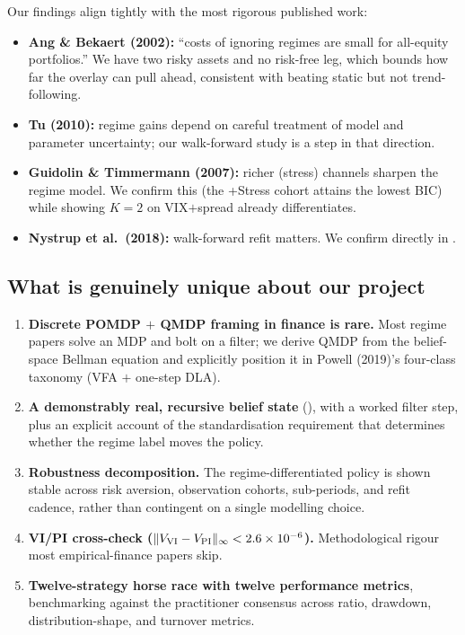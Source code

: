 \documentclass[11pt]{article}
\theoremstyle{plain1}
\theoremstyle{definition1}
\newcommand{\1}{\mathbf{1}}
\begin{document}
Our findings align tightly with the most rigorous published work:
\begin{itemize}[leftmargin=1.5em]
  \item \textbf{Ang \& Bekaert (2002):} ``costs of ignoring regimes are small for all-equity portfolios.'' We have two risky assets and no risk-free leg, which bounds how far the overlay can pull ahead, consistent with beating static but not trend-following.
  \item \textbf{Tu (2010):} regime gains depend on careful treatment of model and parameter uncertainty; our walk-forward study is a step in that direction.
  \item \textbf{Guidolin \& Timmermann (2007):} richer (stress) channels sharpen the regime model. We confirm this (the +Stress cohort attains the lowest BIC) while showing $K=2$ on VIX$+$spread already differentiates.
  \item \textbf{Nystrup et al.\ (2018):} walk-forward refit matters. We confirm directly in .
\end{itemize}

\subsection{What is genuinely unique about our project}

\begin{enumerate}[leftmargin=1.5em,itemsep=2pt]
  \item \textbf{Discrete POMDP $+$ QMDP framing in finance is rare.} Most regime papers solve an MDP and bolt on a filter; we derive QMDP from the belief-space Bellman equation and explicitly position it in Powell (2019)'s four-class taxonomy (VFA $+$ one-step DLA).
  \item \textbf{A demonstrably real, recursive belief state} (), with a worked filter step, plus an explicit account of the standardisation requirement that determines whether the regime label moves the policy.
  \item \textbf{Robustness decomposition.} The regime-differentiated policy is shown stable across risk aversion, observation cohorts, sub-periods, and refit cadence, rather than contingent on a single modelling choice.
  \item \textbf{VI/PI cross-check ($\|V_{\rm VI} - V_{\rm PI}\|_\infty < 2.6 \times 10^{-6}$).} Methodological rigour most empirical-finance papers skip.
  \item \textbf{Twelve-strategy horse race with twelve performance metrics}, benchmarking against the practitioner consensus across ratio, drawdown, distribution-shape, and turnover metrics.
\end{enumerate}
\end{document}
